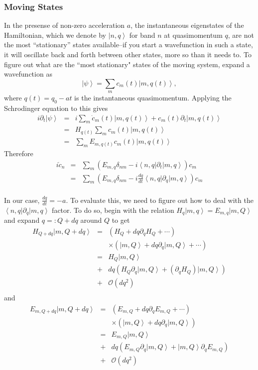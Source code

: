 \documentclass[aps,twocolumn,prb,floatfix,amsmath,amssymb,groupedaddress]{revtex4}
\begin{document}
\subsubsection{Moving States}
In the presense of non-zero acceleration $a$, the instantaneous eigenstates of the Hamiltonian, which we denote by $\left|n,q\right>$ for band $n$ at quasimomentum $q$, are not the most ``stationary'' states available--if you start a wavefunction in such a state, it will oscillate back and forth between other states, more so than it needs to.  To figure out what are the ``most stationary" states of the moving system, expand a wavefunction as
\[\left|\psi\right> = \sum_m c_m(t) \left|m,q(t)\right>,\]
where $q(t) = q_0 - at$ is the instantaneous quasimomentum.  Applying the Schrodinger equation to this gives
\begin{eqnarray*}
i\partial_t\left|\psi\right> & = & i \sum_m \dot{c}_m(t) \left|m,q(t)\right> + c_m(t)\partial_t \left|m,q(t)\right> \\
& = & H_{q(t)} \sum_m c_m(t) \left|m,q(t)\right> \\
& = & \sum_m E_{m,q(t)} c_m(t) \left|m,q(t)\right>
\end{eqnarray*}
Therefore
\begin{eqnarray*}
i\dot{c}_n & = & \sum_m \left(E_{m,q} \delta_{nm} - i \left<n,q\right| \partial_t \left|m,q\right>\right) c_m \\
& = & \sum_m \left(E_{m,q} \delta_{nm} - i \frac{dq}{dt} \left<n,q\right| \partial_q \left|m,q\right>\right) c_m \\
\end{eqnarray*}

In our case, $\frac{dq}{dt} = -a$.  To evaluate this, we need to figure out how to deal with the $\left<n,q\right|\partial_q\left|m,q\right>$ factor.  To do so, begin with the relation $H_q \left|m,q\right> = E_{m,q} \left|m,Q\right>$ and expand $q =: Q + dq$ around $Q$ to get 
\begin{eqnarray*}
H_{Q+dq} \left|m,Q+dq\right> & = & \left(H_Q + dq \partial_qH_Q + \cdots\right) \\
& & \times\left(\left|m,Q\right>+dq\partial_q\left|m,Q\right> + \cdots\right) \\
& = & H_Q\left|m,Q\right> \\
& + & dq\left(H_Q\partial_q\left|m,Q\right> + \left(\partial_qH_Q\right)\left|m,Q\right>\right) \\
& + & \mathcal{O}(dq^2) \\
\end{eqnarray*}
and
\begin{eqnarray*}
\!\!\!E_{m,Q+dq} \left|m,Q+dq\right> & = & \left(E_{m,Q} + dq \partial_q E_{m,Q} + \cdots\right) \\
& & \times \left(\left|m,Q\right> + dq \partial_q \left|m,Q\right>\right) \\
& = & E_{m,Q} \left|m,Q\right> \\
& + & dq \left(E_{m,Q}\partial_q\left|m,Q\right> + \left|m,Q\right>\partial_q E_{m,Q}\right) \\
& + & \mathcal{O}(dq^2)
\end{eqnarray*}
\end{document}
